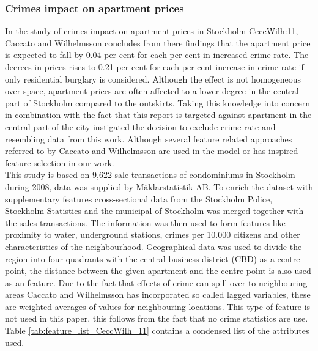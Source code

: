 \subsubsection{Crimes impact on apartment prices}
In the study of crimes impact on apartment prices in Stockholm \cite{art}{CeccWilh:11}, Caccato and Wilhelmsson concludes from there findings that the apartment price is expected to fall by 0.04 per cent for each per cent in increased crime rate. The decrees in prices rises to 0.21 per cent for each per cent increase in crime rate if only residential burglary is considered. Although the effect is not homogeneous over space, apartment prices are often affected to a lower degree in the central part of Stockholm compared to the outskirts. Taking this knowledge into concern in combination with the fact that this report is targeted against apartment in the central part of the city instigated the decision to exclude crime rate and resembling data from this work. Although several feature related approaches referred to by Caccato and Wilhelmsson are used in the model or has inspired feature selection in our work.  
\\
This study is based on 9,622 sale transactions of condominiums in Stockholm during 2008, data was supplied by M{\"a}klarstatistik AB. To enrich the dataset with supplementary features cross-sectional data from the Stockholm Police, Stockholm Statistics and the municipal of Stockholm was merged together with the sales transactions. The information was then used to form features like proximity to water, underground stations, crimes per 10.000 citizens and other characteristics of the neighbourhood. Geographical data was used to divide the region into four quadrants with the central business district (CBD) as a centre point, the distance between the given apartment and the centre point is also used as an feature. Due to the fact that effects of crime can spill-over to neighbouring areas Caccato and Wilhelmsson has incorporated so called lagged variables, these are weighted averages of values for neighbouring locations. This type of feature is not used in this paper, this follows from the fact that no crime statistics are use. Table \ref{tab:feature_list_CeccWilh_11} contains a condensed list of the attributes used.
\\
